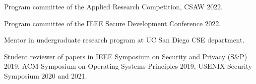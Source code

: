 { Program committee of the Applied Research Competition, CSAW 2022. }

{ Program committee of the IEEE Secure Development Conference 2022. }

{ Mentor in  undergraduate research program at UC San Diego CSE department. }

{ Student reviewer of papers in IEEE Symposium on Security and Privacy (S\&P)
2019, ACM Symposium on Operating Systems Principles 2019, USENIX Security
Symposium 2020 and 2021. }
